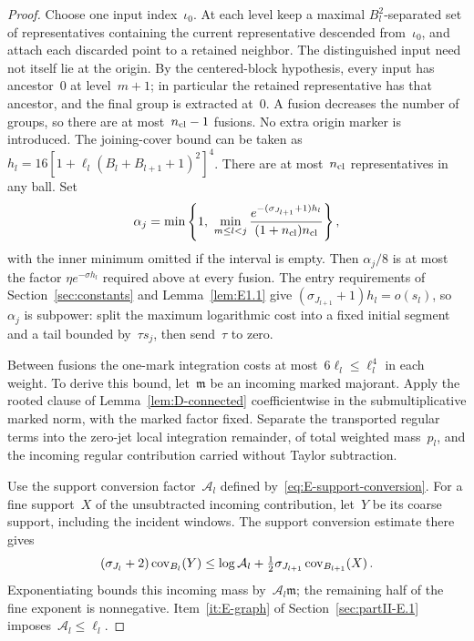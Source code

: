 \begin{proof}
Choose one input index~$\iota_0$. At each level keep a maximal $B_l^2$-separated set of representatives containing the current representative descended from~$\iota_0$, and attach each discarded point to a retained neighbor. The distinguished input need not itself lie at the origin. By the centered-block hypothesis, every input has ancestor~$0$ at level~$m+1$; in particular the retained representative has that ancestor, and the final group is extracted at~$0$. A fusion decreases the number of groups, so there are at most~$n_{\rm cl}-1$ fusions. No extra origin marker is introduced. The joining-cover bound can be taken as
$h_l=16[1+\ell_l(B_l+B_{l+1}+1)^2]^4$.
There are at most~$n_{\rm cl}$ representatives in any ball. Set
\begin{equation*}
\alpha_j=\min\left\{1,\ \min_{m\le l<j}\frac{e^{-(\sigma_{J_{l+1}}+1)h_l}}{(1+n_{\rm cl})n_{\rm cl}}\right\},
\end{equation*}
with the inner minimum omitted if the interval is empty. Then $\alpha_j/8$ is at most the factor $\eta e^{-\sigma h_l}$ required above at every fusion. The entry requirements of Section~\ref{sec:constants} and Lemma~\ref{lem:E1.1} give $(\sigma_{J_{l+1}}+1)h_l=o(s_l)$, so~$\alpha_j$ is subpower: split the maximum logarithmic cost into a fixed initial segment and a tail bounded by~$\tau s_j$, then send~$\tau$ to zero.

Between fusions the one-mark integration costs at most~$6\ell_l\le\ell_l^4$ in each weight. To derive this bound, let~$\mathfrak m$ be an incoming marked majorant. Apply the rooted clause of Lemma~\ref{lem:D-connected} coefficientwise in the submultiplicative marked norm, with the marked factor fixed. Separate the transported regular terms into the zero-jet local integration remainder, of total weighted mass~$p_l$, and the incoming regular contribution carried without Taylor subtraction.

Use the support conversion factor~$\mathcal A_l$ defined by~\eqref{eq:E-support-conversion}. For a fine support~$X$ of the unsubtracted incoming contribution, let~$Y$ be its coarse support, including the incident windows. The support conversion estimate there gives
\begin{equation*}
(\sigma_{J_l}+2)\operatorname{cov}_{B_l}(Y)
\le\log\mathcal A_l+\tfrac12\sigma_{J_{l+1}}\operatorname{cov}_{B_{l+1}}(X)\,.
\end{equation*}
Exponentiating bounds this incoming mass by~$\mathcal A_l\mathfrak m$; the remaining half of the fine exponent is nonnegative. Item~\ref{it:E-graph} of Section~\ref{sec:partII-E.1} imposes~$\mathcal A_l\le\ell_l$.


\end{proof}
